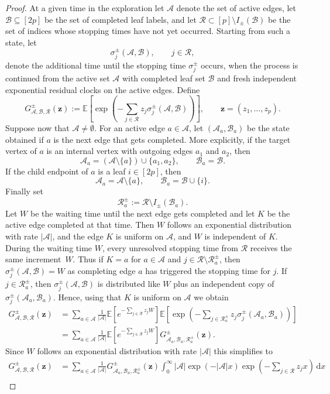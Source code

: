 \documentclass[english,11pt]{smfart}
\newcommand{\Exb}[1]{\mathbb{E}\left[#1\right]}
\newcommand{\cA}{\mathcal{A}}
\newcommand{\cB}{\mathcal{B}}
\newcommand{\cR}{\mathcal{R}}
\numberwithin{equation}{section}
\begin{document}
\begin{proof}
	At a given time in the exploration let $\cA$ denote the set of active edges, let $\cB\subseteq[2p]$ be
	the set of completed leaf labels, and let $\cR \subset [p]\setminus I_\pm(\cB)$
	be the set of indices whose stopping times have not yet occurred. Starting
	from such a state, let
	\[
		\sigma_j^\pm(\cA,\cB), \qquad j\in \cR,
	\]
	denote the additional time until the stopping time $\sigma_j^\pm$
	occurs, when the process is continued from the active set $\cA$ with
	completed leaf set $\cB$ and fresh independent exponential residual clocks on
	the active edges. Define
	\[
		G_{\cA,\cB,\cR}^\pm(\bm z) := \Exb{\exp\left(-\sum_{j\in \cR}z_j\sigma_j^\pm(\cA,\cB)\right)},
		\qquad \bm z=(z_1,\ldots,z_p).
	\]
	Suppose now that $\cA \ne \emptyset$. For an active edge $a \in \cA$, let $(\cA_a,\cB_a)$ be the state obtained if $a$ is the next edge that gets completed. More explicitly, if the target vertex of $a$ is an internal vertex with outgoing edges $a_1$ and $a_2$, then
	\[
		\cA_a = (\cA\setminus\{a\})\cup\{a_1,a_2\}, \qquad \cB_a=\cB.
	\]
	If the child endpoint of $a$ is a leaf $i \in [2p]$, then
	\[
		\cA_a = \cA \setminus\{a\}, \qquad \cB_a=\cB\cup\{i\}.
	\]
	Finally set
	\[
		\cR_a^\pm:=\cR\setminus I_\pm(\cB_a).
	\]
	Let $W$ be the waiting time until the next edge gets completed and let $K$ be the active edge completed at that time. Then $W$ follows an exponential distribution with rate $|\cA|$, and the edge $K$ is uniform on $\cA$, and $W$ is independent of $K$. During the waiting time $W$, every unresolved stopping time from $\cR$ receives the same increment~$W$. Thus if $K=a$ for $a \in \cA$ and $j \in \cR \setminus \cR_{a}^\pm$, then $\sigma_j^\pm(\cA, \cB) = W$ as completing edge $a$ has triggered the stopping time for $j$.  If $j \in \cR_{a}^\pm$, then $\sigma_j^\pm(\cA, \cB)$ is distributed like $W$ plus an independent copy of $\sigma_j^{\pm}(\cA_a, \cB_a)$. Hence, using that $K$ is uniform on $\cA$ we obtain
	\begin{align*}
		G_{\cA,\cB,\cR}^\pm(\bm z) &= \sum_{a \in \cA} \frac{1}{|\cA|} \Exb{e^{-\sum_{j\in \cR}z_jW}} \Exb{\exp\left(-\sum_{j\in \cR_a^\pm}z_j\sigma_j^\pm(\cA_a,\cB_a)\right)}  \\
		&= \sum_{a\in\cA} \frac{1}{|\cA|} \Exb{e^{-\sum_{j\in \cR}z_jW}} G_{\cA_a,\cB_a,\cR_a^\pm}^\pm(\bm z).
	\end{align*}	
	Since $W$ follows an exponential distribution with rate $|\cA|$ this simplifies to
	\begin{align}
		\label{eq:gabr}
		G_{\cA,\cB,\cR}^\pm(\bm z) &= \sum_{a\in\cA} \frac{1}{|\cA|} G_{\cA_a,\cB_a,\cR_a^\pm}^\pm(\bm z)  \int_{0}^\infty |\cA| \exp(- |\cA|x) \exp\left(- \sum_{j \in \cR} z_j x\right)\,\mathrm{d}x  \\

\end{align}
\end{proof}
\end{document}
